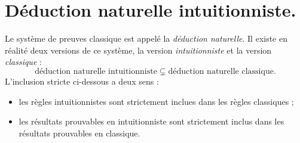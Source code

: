 \documentclass{../notes}
\begin{document}
  \section{Déduction naturelle intuitionniste.}

  Le système de preuves classique est appelé la \textit{déduction naturelle}. Il existe en réalité deux versions de ce système, la version \textit{intuitionniste} et la version \textit{classique} :
  \[
    \text{déduction naturelle intuitionniste} \subsetneq \text{déduction naturelle classique}
  .\] 
  L'inclusion stricte ci-dessous a deux sens :
  \begin{itemize}
    \item les règles intuitionnistes sont strictement inclues dans les règles classiques ;
    \item les résultats prouvables en intuitionniste sont strictement inclus dans les résultats prouvables en classique.
  \end{itemize}
\end{document}
